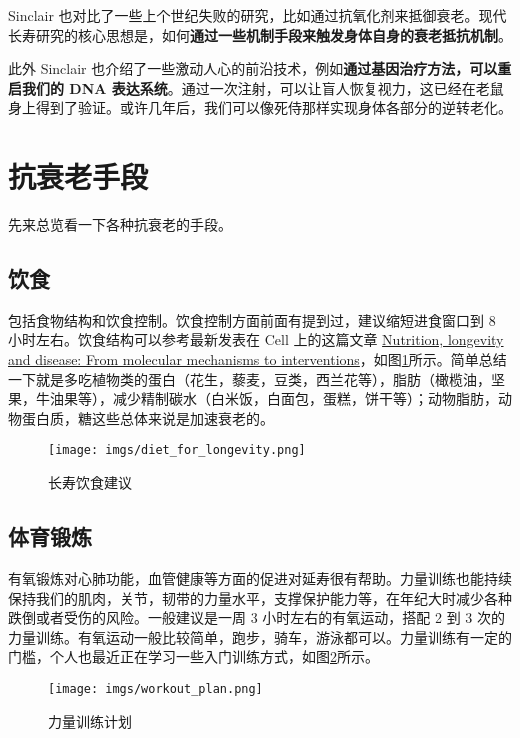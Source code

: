\documentclass{report}
\begin{document}
Sinclair 也对比了一些上个世纪失败的研究，比如通过抗氧化剂来抵御衰老。现代长寿研究的核心思想是，如何\textbf{通过一些机制手段来触发身体自身的衰老抵抗机制}。

此外 Sinclair 也介绍了一些激动人心的前沿技术，例如\textbf{通过基因治疗方法，可以重启我们的 DNA 表达系统}。通过一次注射，可以让盲人恢复视力，这已经在老鼠身上得到了验证。或许几年后，我们可以像死侍那样实现身体各部分的逆转老化。

\section{抗衰老手段}

先来总览看一下各种抗衰老的手段。

\subsection{饮食}

包括食物结构和饮食控制。饮食控制方面前面有提到过，建议缩短进食窗口到 8 小时左右。饮食结构可以参考最新发表在 Cell 上的这篇文章 \href{https://www.cell.com/cell/pdf/S0092-8674(22)00398-1.pdf}{Nutrition, longevity and disease: From molecular mechanisms to interventions}，如图\ref{fig:diet}所示。简单总结一下就是多吃植物类的蛋白（花生，藜麦，豆类，西兰花等），脂肪（橄榄油，坚果，牛油果等），减少精制碳水（白米饭，白面包，蛋糕，饼干等）；动物脂肪，动物蛋白质，糖这些总体来说是加速衰老的。

\begin{figure}[htpb]
    \centering
    \texttt{[image: imgs/diet\_for\_longevity.png]}
    \caption{长寿饮食建议}
    \label{fig:diet}
\end{figure}

\subsection{体育锻炼}

有氧锻炼对心肺功能，血管健康等方面的促进对延寿很有帮助。力量训练也能持续保持我们的肌肉，关节，韧带的力量水平，支撑保护能力等，在年纪大时减少各种跌倒或者受伤的风险。一般建议是一周 3 小时左右的有氧运动，搭配 2 到 3 次的力量训练。有氧运动一般比较简单，跑步，骑车，游泳都可以。力量训练有一定的门槛，个人也最近正在学习一些入门训练方式，如图\ref{fig:workout}所示。

\begin{figure}[htpb]
    \centering
    \texttt{[image: imgs/workout\_plan.png]}
    \caption{力量训练计划}
    \label{fig:workout}
\end{figure}
\end{document}
